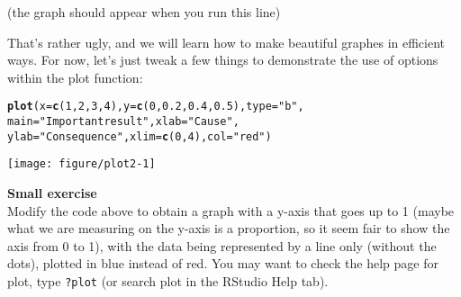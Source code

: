 \documentclass[12pt,a4paper]{scrartcl}\usepackage[]{graphicx}\usepackage[]{color}
\makeatletter
\def\maxwidth{ %
  \ifdim\Gin@nat@width>\linewidth
    \linewidth
  \else
    \Gin@nat@width
  \fi
}
\newcommand{\hlnum}[1]{\textcolor[rgb]{0.686,0.059,0.569}{#1}}%
\newcommand{\hlstr}[1]{\textcolor[rgb]{0.192,0.494,0.8}{#1}}%
\newcommand{\hlstd}[1]{\textcolor[rgb]{0.345,0.345,0.345}{#1}}%
\newcommand{\hlkwc}[1]{\textcolor[rgb]{0.333,0.667,0.333}{#1}}%
\newcommand{\hlkwd}[1]{\textcolor[rgb]{0.737,0.353,0.396}{\textbf{#1}}}%
\newenvironment{kframe}{%
 \def\at@end@of@kframe{}%
 \ifinner\ifhmode%
  \def\at@end@of@kframe{\end{minipage}}%
  \begin{minipage}{\columnwidth}%
 \fi\fi%
 \def\FrameCommand##1{\hskip\@totalleftmargin \hskip-\fboxsep
 \colorbox{shadecolor}{##1}\hskip-\fboxsep
     \hskip-\linewidth \hskip-\@totalleftmargin \hskip\columnwidth}%
 \MakeFramed {\advance\hsize-\width
   \@totalleftmargin\z@ \linewidth\hsize
   \@setminipage}}%
 {\par\unskip\endMakeFramed%
 \at@end@of@kframe}
\newenvironment{knitrout}{}{} %
\makeatother
\begin{document}
(the graph should appear when you run this line)


That's rather ugly, and we will learn how to make beautiful graphes in efficient ways. For now, let's just tweak a few things to demonstrate the use of options within the plot function:

\begin{knitrout}
\color{fgcolor}\begin{kframe}
\begin{alltt}
\hlkwd{plot}\hlstd{(}\hlkwc{x} \hlstd{=} \hlkwd{c}\hlstd{(}\hlnum{1}\hlstd{,}\hlnum{2}\hlstd{,}\hlnum{3}\hlstd{,}\hlnum{4}\hlstd{),} \hlkwc{y}\hlstd{=}\hlkwd{c}\hlstd{(}\hlnum{0}\hlstd{,}\hlnum{0.2}\hlstd{,}\hlnum{0.4}\hlstd{,}\hlnum{0.5}\hlstd{),} \hlkwc{type} \hlstd{=} \hlstr{"b"}\hlstd{,}
     \hlkwc{main} \hlstd{=} \hlstr{"Important result"}\hlstd{,} \hlkwc{xlab} \hlstd{=} \hlstr{"Cause"}\hlstd{,}
     \hlkwc{ylab} \hlstd{=} \hlstr{"Consequence"}\hlstd{,} \hlkwc{xlim} \hlstd{=} \hlkwd{c}\hlstd{(}\hlnum{0}\hlstd{,}\hlnum{4}\hlstd{),} \hlkwc{col}\hlstd{=}\hlstr{"red"}\hlstd{)}
\end{alltt}
\end{kframe}
\texttt{[image: figure/plot2-1]} 

\end{knitrout}

\begin{mdframed}
\textbf{Small exercise}\\
Modify the code above to obtain a graph with a y-axis that goes up to 1 (maybe what we are measuring on the y-axis is a proportion, so it seem fair to show the axis from 0 to 1), with the data being represented by a line only (without the dots), plotted in blue instead of red. You may want to check the help page for plot, type \texttt{?plot} (or search plot in the RStudio Help tab).
\end{mdframed}
\end{document}
